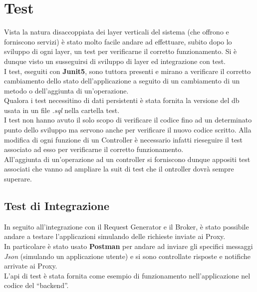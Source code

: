 \chapter{Test}
Vista la natura disaccoppiata dei layer verticali del sistema (che offrono e forniscono servizi) è stato molto facile andare ad effettuare, subito dopo lo sviluppo di ogni layer, un test per verificarne il corretto funzionamento. Si è dunque visto un susseguirsi di sviluppo di layer ed integrazione con test.
\\I test, eseguiti con \textbf{Junit5}, sono tuttora presenti e mirano a verificare il corretto cambiamento dello stato dell’applicazione a seguito di un cambiamento di un metodo o dell’aggiunta di un’operazione.
\\Qualora i test necessitino di dati persistenti è stata fornita la versione del db usata in un file \textit{.sql} nella cartella test.
\\I test non hanno avuto il solo scopo di verificare il codice fino ad un determinato punto dello sviluppo ma  servono anche per verificare il nuovo codice scritto. Alla modifica di ogni funzione di un Controller è necessario infatti rieseguire il test associato ad esso per verificarne il corretto funzionamento.
\\All’aggiunta di un’operazione ad un controller si forniscono dunque appositi test associati che vanno ad ampliare la suit di test che il ontroller dovrà sempre superare.
\section{Test di Integrazione}
In seguito all’integrazione con il Request Generator e il Broker, è stato possibile andare a testare l’applicazioni simulando delle richieste inviate ai Proxy.
\\In particolare è stato usato \textbf{Postman} per andare ad inviare gli specifici messaggi \textit{Json} (simulando un applicazione utente) e si sono controllate risposte e notifiche arrivate ai Proxy.
\\L’api di test è stata fornita come esempio di funzionamento nell’applicazione nel codice del “backend”.

